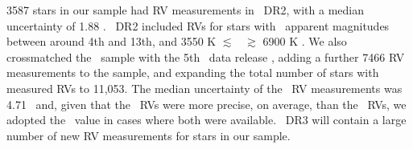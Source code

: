3587 stars in our sample had RV measurements in \gaia\ DR2, with a median
uncertainty of 1.88 \kms.
\gaia\ DR2 included RVs for stars with \gaia\ apparent magnitudes between
around 4th and 13th, and 3550 K $\lesssim$ \teff\ $\gtrsim$ 6900 K
\citep{brown2018}.
We also crossmatched the \mct\ sample with the 5th \lamost\ data release
\citep{cui2012, xiang2019}, adding a further 7466 RV measurements to the
sample, and expanding the total number of stars with measured RVs to 11,053.
The median uncertainty of the \lamost\ RV measurements was 4.71 \kms\ and,
given that the \gaia\ RVs were more precise, on average, than the \lamost\
RVs, we adopted the \gaia\ value in cases where both were available.
\gaia\ DR3 will contain a large number of new RV measurements for stars in our
sample.
